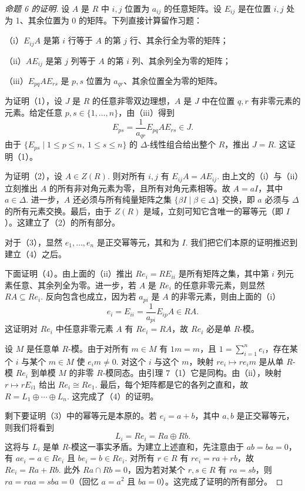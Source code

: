 \begin{proof}[命题 6 的证明]
设 \(A\) 是 \(R\) 中 \(i,j\) 位置为 \(a_{ij}\) 的任意矩阵。设 \(E_{ij}\) 是在位置 \(i,j\) 处为 1、其余位置为 0 的矩阵。下列直接计算留作习题：

（i）\(E_{ij}A\) 是第 \(i\) 行等于 \(A\) 的第 \(j\) 行、其余行全为零的矩阵；

（ii）\(AE_{ij}\) 是第 \(j\) 列等于 \(A\) 的第 \(i\) 列、其余列全为零的矩阵；

（iii）\(E_{pq}AE_{rs}\) 是 \(p,s\) 位置为 \(a_{qr}\)、其余位置全为零的矩阵。

为证明（1），设 \(J\) 是 \(R\) 的任意非零双边理想，\(A\) 是 \(J\) 中在位置 \(q,r\) 有非零元素的元素。给定任意 \(p, s \in \{1, \ldots, n\}\)，由（iii）得到
\[
E_{ps} = \frac{1}{a_{qr}}E_{pq}AE_{rs} \in J.
\]
由于 \(\{E_{ps} \mid 1 \leq p \leq n,\ 1 \leq s \leq n\}\) 的 \(\Delta\)-线性组合给出整个 \(R\)，推出 \(J = R\). 这证明（1）。

为证明（2），设 \(A \in Z(R)\). 则对所有 \(i,j\) 有 \(E_{ij}A = AE_{ij}\). 由上文的（i）与（ii）立刻推出 \(A\) 的所有非对角元素为零，且所有对角元素相等。故 \(A = aI\)，其中 \(a \in \Delta\). 进一步，\(A\) 还必须与所有纯量矩阵之集 \(\{\beta I \mid \beta \in \Delta\}\) 交换，即 \(a\) 必须与 \(\Delta\) 的所有元素交换。最后，由于 \(Z(R)\) 是域，立刻可知它含唯一的幂等元（即 \(I\)）。这建立了（2）的所有部分。

对于（3），显然 \(e_1, \ldots, e_n\) 是正交幂等元，其和为 \(I\). 我们把它们本原的证明推迟到建立（4）之后。

下面证明（4）。由上面的（ii）推出 \(Re_i = RE_{ii}\) 是所有矩阵之集，其中第 \(i\) 列元素任意、其余列全为零。进一步，若 \(A\) 是 \(Re_i\) 的任意非零元素，则显然 \(RA \subseteq Re_i\). 反向包含也成立，因为若 \(a_{pi}\) 是 \(A\) 的非零元素，则由上面的（i）
\[
e_i = E_{ii} = \frac{1}{a_{pi}}E_{ip}A \in RA.
\]
这证明对 \(Re_i\) 中任意非零元素 \(A\) 有 \(Re_i = RA\)，故 \(Re_i\) 必是单 \(R\)-模。

设 \(M\) 是任意单 \(R\)-模。由于对所有 \(m \in M\) 有 \(1m = m\)，且 \(1 = \sum_{i=1}^{n}e_i\)，存在某个 \(i\) 与某个 \(m \in M\) 使 \(e_im \neq 0\). 对这个 \(i\) 与这个 \(m\)，映射 \(re_i \mapsto re_im\) 是从单 \(R\)-模 \(Re_i\) 到单模 \(M\) 的非零 \(R\)-模同态。由引理 7（1）它是同构。由（ii），映射 \(r \mapsto rE_{i1}\) 给出 \(Re_i \cong Re_1\). 最后，每个矩阵都是它的各列之直和，故 \(R = L_1 \oplus \cdots \oplus L_n\). 这完成了（4）的证明。

剩下要证明（3）中的幂等元是本原的。若 \(e_i = a+b\)，其中 \(a,b\) 是正交幂等元，则我们将看到
\[
L_i = Re_i = Ra \oplus Rb.
\]
这将与 \(L_i\) 是单 \(R\)-模这一事实矛盾。为建立上述直和，先注意由于 \(ab = ba = 0\)，有 \(ae_i = a \in Re_i\) 且 \(be_i = b \in Re_i\). 对所有 \(r \in R\) 有 \(re_i = ra+rb\)，故 \(Re_i = Ra+Rb\). 此外 \(Ra \cap Rb = 0\)，因为若对某个 \(r,s \in R\) 有 \(ra = sb\)，则 \(ra = raa = sba = 0\)（回忆 \(a = a^2\) 且 \(ba = 0\)）。这完成了证明的所有部分。
\end{proof}


